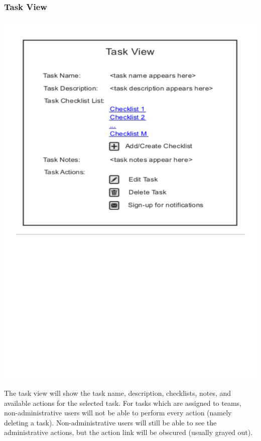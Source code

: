 \documentclass{article}
\begin{document}
\subsubsection{Task View}
\begin{center}
\includegraphics[trim = 0cm 12cm 0cm 0cm, clip=true, scale=0.7]{images/taskview}
\end{center}
The task view will show the task name, description, checklists, notes, and available actions for the selected task.
For tasks which are assigned to teams, non-administrative users will not be able to perform every action (namely deleting a task).
Non-administrative users will still be able to see the administrative actions, but the action link will be obscured (usually grayed out).
\end{document}
